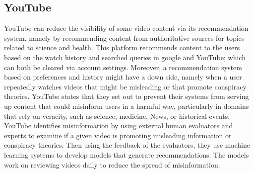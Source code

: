 \documentclass{article}
\begin{document}

\subsection{YouTube}

YouTube can reduce the visibility of some video content via its recommendation system, namely by recommending content from authoritative sources for topics related to science and health. This platform recommends content to the users based on the watch history and searched queries in google and YouTube; which can both be cleared via account settings. Moreover, a recommendation system based on preferences and history might have a down side, namely when a user repeatedly watches videos that might be misleading or that promote conspiracy theories. YouTube states that they set out to prevent their systems from serving up content that could misinform users in a harmful way, particularly in domains that rely on veracity, such as science, medicine, News, or historical events.  YouTube identifies misinformation by using external human evaluators and experts to examine if a given video is promoting misleading information or conspiracy theories. Then using the feedback of the evaluators, they use machine learning systems to develop models that generate recommendations. The models work on reviewing videos daily to reduce the spread of misinformation. 

\smallskip
\end{document}
